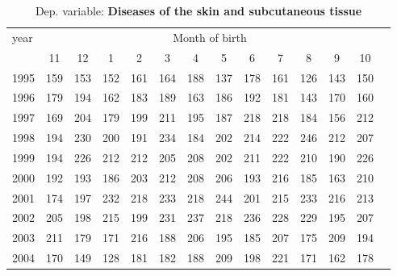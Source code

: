  \begin{table}[H] \begin{threeparttable} \centering \caption{Dep. variable: \textbf{Diseases of the skin and subcutaneous tissue}} {\def\sym#1{\ifmmode^{#1}\else\(^{#1}\)\fi} \begin{tabular}{l*{13}{c}} \toprule year & \multicolumn{12}{c}{Month of birth} \\ \cmidrule(lr){2-13} 
            &          11&          12&           1&           2&           3&           4&           5&           6&           7&           8&           9&          10\\
1995        &         159&         153&         152&         161&         164&         188&         137&         178&         161&         126&         143&         150\\
1996        &         179&         194&         162&         183&         189&         163&         186&         192&         181&         143&         170&         160\\
1997        &         169&         204&         179&         199&         211&         195&         187&         218&         218&         184&         156&         212\\
1998        &         194&         230&         200&         191&         234&         184&         202&         214&         222&         246&         212&         207\\
1999        &         194&         226&         212&         212&         205&         208&         202&         211&         222&         210&         190&         226\\
2000        &         192&         193&         186&         203&         212&         208&         206&         193&         216&         185&         163&         210\\
2001        &         174&         197&         232&         218&         233&         218&         244&         201&         215&         233&         216&         213\\
2002        &         205&         198&         215&         199&         231&         237&         218&         236&         228&         229&         195&         207\\
2003        &         211&         179&         171&         216&         188&         206&         195&         185&         207&         175&         209&         194\\
2004        &         170&         149&         128&         181&         182&         188&         209&         198&         221&         171&         162&         178\\

\end{tabular}}
\end{threeparttable}
\end{table}
